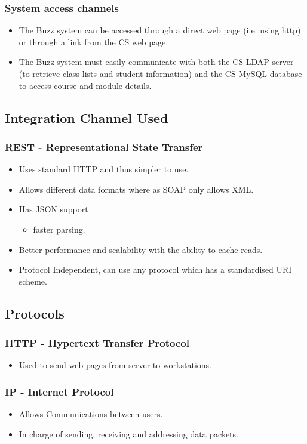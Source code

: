 \documentclass[12pt, oneside]{article}
\begin{document}
		\subsubsection{System access channels}
			\begin{itemize}
				\item The Buzz system can be accessed through a direct web page (i.e. using http) or through a link from the CS web page.
				\item The Buzz system must easily communicate with both the CS LDAP server (to retrieve class lists and student information) and the CS MySQL database to access course and module details.
			\end{itemize}
	\subsection{Integration Channel Used}
		\subsubsection{REST - Representational State Transfer}
		\begin{itemize}
			\item Uses standard HTTP and thus simpler to use.
		 	\item Allows different data formats where as SOAP only allows XML.
			\item Has JSON support
				\begin{itemize}
					\item faster parsing.				
				\end{itemize}			 
			\item Better performance and scalability with the ability to cache reads.
			\item Protocol Independent, can use any protocol which has a standardised URI scheme.		
		\end{itemize}
	\subsection{Protocols}
		\subsubsection{HTTP - Hypertext Transfer Protocol}
			\begin{itemize}
				\item Used to send web pages from server to workstations.  
			\end{itemize}
		\subsubsection{IP - Internet Protocol}	
			\begin{itemize}
				\item Allows Communications between users.
				\item In charge of sending, receiving and addressing data packets.
			\end{itemize}				
\end{document}
